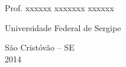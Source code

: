 \begin{titlepage}
\begin{center}
        \centerline{\underline{ }\underline{ }\underline{ }\underline{ }\underline{ }\underline{ }\underline{ }\underline{ }\underline{ }\underline{ }\underline{ }\underline{ }\underline{ }\underline{ }\underline{ }\underline{ }\underline{ }\underline{ }\underline{ }\underline{ }\underline{ }\underline{ }\underline{ }\underline{ }\underline{ }\underline{ }\underline{ }\underline{ }\underline{ }\underline{ }\underline{ }\underline{ }\underline{ }\underline{ }\underline{ }\underline{ }\underline{ }\underline{ }\underline{ }\underline{ }\underline{ }\underline{ }\underline{ }\underline{ }\underline{ }\underline{ }\underline{ }\underline{ }\underline{ }\underline{ }\underline{ }\underline{ }\underline{ }\underline{ }\underline{ }\underline{ }\underline{ }\underline{ }\underline{ }\underline{ }\underline{ }\underline{ }\underline{ }\underline{ }\underline{ }\underline{ }\underline{ }\underline{ }\underline{ }\underline{ }\underline{ }\underline{ }\underline{ }\underline{ }\underline{ }\underline{ }\underline{ }}
        \centerline{Prof. xxxxxx xxxxxxx xxxxxx}
        \centerline{Universidade Federal de Sergipe}
        \centerline{}

        \vfill
        {\large S\~ao Crist\'ov\~ao -- SE} \\
        {\large 2014}
    \end{center}
\end{titlepage}
\pagebreak





%
%
%
%


